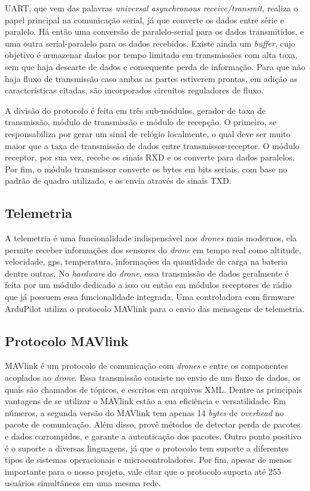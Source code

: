 \documentclass[12pt,a4paper,oneside]{book}
\begin{document}
UART, que vem das palavras \textit{universal asynchronous receive/transmit}, realiza o papel principal na comunicação serial, já que converte os dados entre série e paralelo. Há então uma conversão de paralelo-serial para os dados transmitidos, e uma outra serial-paralelo para os dados recebidos. Existe ainda um \textit{buffer}, cujo objetivo é armazenar dados por tempo limitado em transmissões com alta taxa, sem que haja descarte de dados e consequente perda de informação. Para que não haja fluxo de transmissão caso ambas as partes estiverem prontas, em adição as características citadas, são incorporados circuitos reguladores de fluxo.

A divisão do protocolo é feita em três sub-módulos, gerador de taxa de transmissão, módulo de transmissão e módulo de recepção. O primeiro, se responsabiliza por gerar um sinal de relógio localmente, o qual deve ser muito maior que a taxa de transmissão de dados entre transmissor-receptor. O módulo receptor, por sua vez, recebe os sinais RXD e os converte para dados paralelos. Por fim, o módulo transmissor converte os bytes em bits seriais, com base no padrão de quadro utilizado, e os envia através de sinais TXD. \cite{uart}

\subsection{Telemetria}

A telemetria é uma funcionalidade indispensável nos \textit{drones} mais modernos, ela permite receber informações dos sensores do \textit{drone} em tempo real como altitude, velocidade, gps, temperatura, informações da quantidade de carga na bateria dentre outras. No  \textit{hardware} do \textit{drone}, essa transmissão de dados geralmente é feita por um módulo dedicado a isso ou então em módulos receptores de rádio que já possuem essa funcionalidade integrada. Uma controladora com firmware ArduPilot utiliza o protocolo MAVlink para o envio das mensagens de telemetria.

\subsection{Protocolo MAVlink}

MAVlink é um protocolo de comunicação com \textit{drones} e entre os componentes acoplados ao \textit{drone}. Essa transmissão consiste no envio de um fluxo de dados, os quais são chamados de tópicos, e escritos em arquivos XML. Dentre as principais vantagens de se utilizar o MAVlink estão a sua eficiência e versatilidade. Em números, a segunda versão do MAVlink tem apenas 14 \textit{bytes} de \textit{overhead} no pacote de comunicação. Além disso, provê métodos de detectar perda de pacotes e dados corrompidos, e garante a autenticação dos pacotes. Outro ponto positivo é o suporte a diversas linguagens, já que o protocolo tem suporte a diferentes tipos de sistemas operacionais e microcontroladores. Por fim, apesar de menos importante para o nosso projeto, vale citar que o protocolo suporta até 255 usuários simultâneos em uma mesma rede.
\cite{MAVlink}
\end{document}
